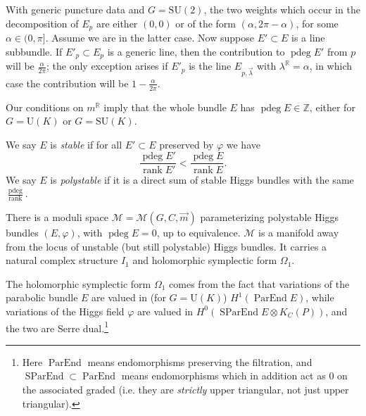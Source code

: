 \documentclass[12pt,letterpaper,reqno]{article}
\numberwithin{equation}{section}
\newcommand{\cM}{\ensuremath{\mathcal M}}
\newcommand{\R}{\ensuremath{\mathbb R}}
\newcommand{\Z}{\ensuremath{\mathbb Z}}
\newcommand{\ti}[1]{\textit{#1}}
\DeclareMathOperator{\ParEnd}{ParEnd}
\DeclareMathOperator{\SParEnd}{SParEnd}
\DeclareMathOperator{\rank}{rank}
\DeclareMathOperator{\pdeg}{pdeg}
\newcommand{\SU}{\mathrm{SU}}
\newcommand{\U}{\mathrm{U}}
\begin{document}
\begin{example}
With generic puncture data and $G = \SU(2)$,
the two weights which occur in the decomposition of 
$E_p$ are either $(0,0)$ or of the form
$(\alpha, 2\pi-\alpha)$, for some $\alpha \in (0,\pi]$.
Assume we are in the latter case.
Now suppose $E' \subset E$ is a line subbundle.
If $E'_p \subset E_p$ is a generic line, then the contribution
to $\pdeg E'$ from $p$ will be $\frac{\alpha}{2\pi}$; the
only exception arises if $E'_p$ is the line 
$E_{p,\vec\lambda}$ with $\lambda^\R = \alpha$, in which case 
the contribution will be $1 - \frac{\alpha}{2\pi}$. 
\end{example}

\begin{remark}[Integrality of $\pdeg E$] Our conditions on $m^\R$ imply that the whole bundle $E$ has $\pdeg E \in \Z$,
either for $G = \U(K)$ or $G = \SU(K)$.
\end{remark}

\begin{defn}
We say $E$ is \ti{stable} if for all $E' \subset E$ preserved
by $\varphi$ we have
\begin{equation}
  \frac{\pdeg E'}{\rank E'} < \frac{\pdeg E}{\rank E}.
\end{equation}
We say $E$ is \ti{polystable} if it is a direct sum of
stable Higgs bundles with the same $\frac{\pdeg}{\rank}$.
\end{defn}

\begin{prop}
There is a moduli space $\cM = \cM(G,C,\vec{m})$ parameterizing
polystable Higgs bundles $(E,\varphi)$, with $\pdeg E = 0$, 
up to equivalence. 
$\cM$ is a manifold away
from the locus of unstable (but still polystable) Higgs bundles.
It carries a natural complex structure $I_1$ and holomorphic symplectic form $\Omega_1$.
\end{prop}

The holomorphic symplectic form 
$\Omega_1$ comes from the fact that variations of the
parabolic bundle $E$ are valued in (for $G = \U(K)$)
$H^1(\ParEnd E)$,
while variations of the Higgs field $\varphi$ are
valued in $H^0(\SParEnd E \otimes K_C(P))$,
and the two are Serre dual.\footnote{Here $\ParEnd$ means
endomorphisms preserving the filtration, and $\SParEnd \subset \ParEnd$ means
endomorphisms which in addition act as $0$
on the associated graded (i.e. they are \ti{strictly} 
upper triangular, not just upper triangular).}
\end{document}
